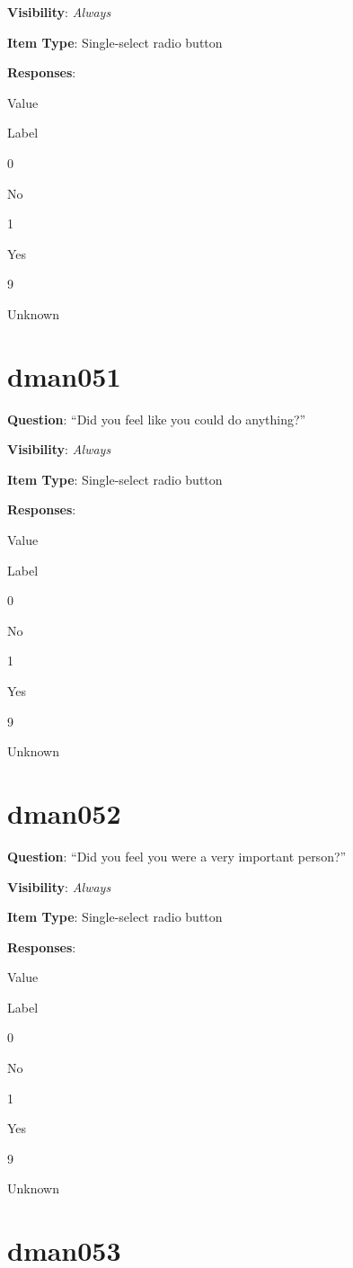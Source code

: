 \documentclass[]{book}
\begin{document}
\textbf{Visibility}: \emph{Always}

\textbf{Item Type}: Single-select radio button

\textbf{Responses}:

Value

Label

0

No

1

Yes

9

Unknown

\hypertarget{dman051}{%
\section{dman051}\label{dman051}}

\textbf{Question}: ``Did you feel like you could do anything?''

\textbf{Visibility}: \emph{Always}

\textbf{Item Type}: Single-select radio button

\textbf{Responses}:

Value

Label

0

No

1

Yes

9

Unknown

\hypertarget{dman052}{%
\section{dman052}\label{dman052}}

\textbf{Question}: ``Did you feel you were a very important person?''

\textbf{Visibility}: \emph{Always}

\textbf{Item Type}: Single-select radio button

\textbf{Responses}:

Value

Label

0

No

1

Yes

9

Unknown

\hypertarget{dman053}{%
\section{dman053}\label{dman053}}
\end{document}
